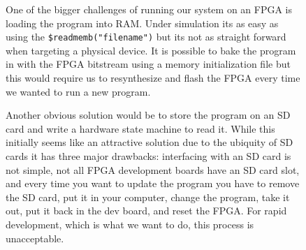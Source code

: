 \documentclass[10pt]{article}
\begin{document}
        \begin{figure}[H]
            \centering
            \begin{minipage}[t]{.6\textwidth}
                \vspace{0pt}
                One of the bigger challenges of running our system on an FPGA
                is loading the program into RAM.  Under simulation its as easy
                as using the \texttt{\$readmemb("filename")} but its not as
                straight forward when targeting a physical device. It is
                possible to bake the program in with the FPGA bitstream using a
                memory initialization file \cite{mif} but this would require us
                to resynthesize and flash the FPGA every time we wanted to run
                a new program.

                \vspace{\baselineskip}
                Another obvious solution would be to store the program on an SD
                card and write a hardware state machine to read it. While this
                initially seems like an attractive solution due to the ubiquity
                of SD cards it has three major drawbacks: interfacing with an
                SD card is not simple, not all FPGA development boards have an
                SD card slot, and every time you want to update the program you
                have to remove the SD card, put it in your computer, change the
                program, take it out, put it back in the dev board, and reset
                the FPGA.  For rapid development, which is what we want to do,
                this process is unacceptable.


\end{minipage}
\end{figure}
\end{document}
